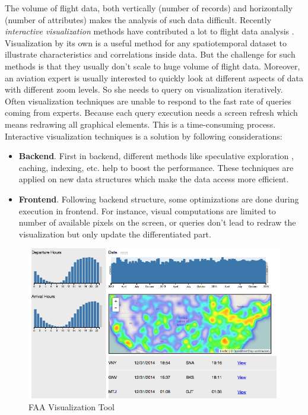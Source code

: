 \documentclass[conference]{IEEEtran}
\begin{document}
The volume of flight data, both vertically (number of records) and horizontally (number of attributes) makes the analysis of such data difficult. Recently {\em interactive visualization} methods have contributed a lot to flight data analysis \cite{lins2013nanocubes}. Visualization by its own is a useful method for any spatiotemporal dataset to illustrate characteristics and correlations inside data. But the challenge for such methods is that they usually don't scale to huge volume of flight data. Moreover, an aviation expert is usually interested to quickly look at different aspects of data with different zoom levels. So she needs to query on visualization iteratively. Often visualization techniques are unable to respond to the fast rate of queries coming from experts. Because each query execution needs a screen refresh which means redrawing all graphical elements. This is a time-consuming process. Interactive visualization techniques is a solution by following considerations:

\begin{itemize}
\item {\bf Backend}. First in backend, different methods like speculative exploration \cite{DBLP:conf/icde/KamatJTN14}, caching, indexing, etc. help to boost the performance. These techniques are applied on new data structures which make the data access more efficient.
\vspace{5pt}
\item {\bf Frontend}. Following backend structure, some optimizations are done during execution in frontend. For instance, visual computations are limited to number of available pixels on the screen, or queries don't lead to redraw the visualization but only update the differentiated part.
\end{itemize}

\begin{figure}[htpb]
\centerline{\includegraphics[width = .8\linewidth, keepaspectratio = true]{figs/spacetime.png}}
\caption{\label{fig:spacetime} FAA Visualization Tool}
\end{figure}
\end{document}
